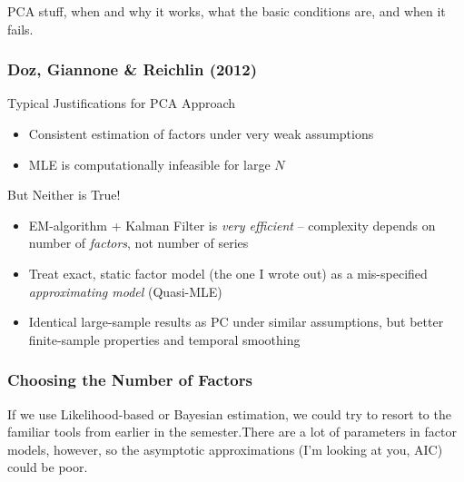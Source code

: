 \documentclass[handout]{beamer}
\begin{document}

\begin{frame}
	PCA stuff, when and why it works, what the basic conditions are, and when it fails.
\end{frame}
\begin{frame}
	\frametitle{Doz, Giannone \& Reichlin (2012)}
\begin{block}
	{Typical Justifications for PCA Approach}
	\begin{itemize}
		\item Consistent estimation of factors under very weak assumptions 
		\item MLE is computationally infeasible for large $N$
	\end{itemize}
\end{block}

\begin{block}
	{But Neither is True!}
	\begin{itemize}
		\item EM-algorithm + Kalman Filter is \emph{very efficient} -- complexity depends on number of \emph{factors}, not number of series
		\item Treat exact, static factor model (the one I wrote out) as a mis-specified \emph{approximating model} (Quasi-MLE)
		\item Identical large-sample results as PC under similar assumptions, but better finite-sample properties and temporal smoothing
	\end{itemize}
\end{block}
\end{frame}
\begin{frame}
	\frametitle{Choosing the Number of Factors}
If we use Likelihood-based or Bayesian estimation, we could try to resort to the familiar tools from earlier in the semester.There are a lot of parameters in factor models, however, so the asymptotic approximations (I'm looking at you, AIC) could be poor. 
\end{frame}
\end{document}
